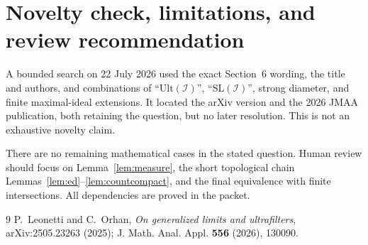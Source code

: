 \documentclass[11pt]{article}
\theoremstyle{definition}
\theoremstyle{remark}
\newcommand{\I}{\mathcal I}
\newcommand{\SL}{\mathrm{SL}}
\newcommand{\Ult}{\mathrm{Ult}}
\begin{document}
\section{Novelty check, limitations, and review recommendation}

A bounded search on 22 July 2026 used the exact Section~6 wording, the title
and authors, and combinations of ``$\Ult(\I)$'', ``$\SL(\I)$'', strong
diameter, and finite maximal-ideal extensions.  It located the arXiv version
and the 2026 JMAA publication, both retaining the question, but no later
resolution.  This is not an exhaustive novelty claim.

There are no remaining mathematical cases in the stated question.  Human
review should focus on Lemma~\ref{lem:measure}, the short topological chain
Lemmas~\ref{lem:ed}--\ref{lem:countcompact}, and the final equivalence with
finite intersections.  All dependencies are proved in the packet.

\begin{thebibliography}{9}
P.~Leonetti and C.~Orhan,
\emph{On generalized limits and ultrafilters},
arXiv:2505.23263 (2025); J. Math. Anal. Appl. \textbf{556} (2026), 130090.
\end{thebibliography}
\end{document}
